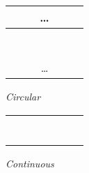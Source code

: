 \vspace{1.1em}
\begin{minipage}[t]{0.5\textwidth}
    \centering
        \begin{tabular}{| c | c | c | c | c | c | c |}
            \multicolumn{7}{c}{\dots} \\
            \hline
            \rowcolor{bootblue} & & & & & & \\
            \hline
            \rowcolor{bootgreen} & & & & & & \\
            \hline
            \rowcolor{bootred} & & & & & & \\
            \hline
            \rowcolor{bootblue} & & & & & & \\
            \hline
            \rowcolor{bootgreen} & & & & & & \\
            \hline
            \rowcolor{bootred} & & & & & & \\
            \hline
            \rowcolor{bootblue} & & & & & & \\
            \hline
            \multicolumn{7}{c}{\dots} \\
        \end{tabular}

        \textit{Circular}
\end{minipage}
\begin{minipage}[t]{0.5\textwidth}
    \centering
        \begin{tabular}{| c | c | c | c | c | c | c |}
            \hline
            \rowcolor{bootblue} & & & & & & \\
            \hline
            \rowcolor{bootblue} & & & & & & \\
            \hline
            \rowcolor{bootblue} & & & & & & \\
            \hline
            \rowcolor{bootgreen} & & & & & & \\
            \hline
            \rowcolor{bootgreen} & & & & & & \\
            \hline
            \rowcolor{bootgreen} & & & & & & \\
            \hline
            \rowcolor{bootred} & & & & & & \\
            \hline
            \rowcolor{bootred} & & & & & & \\
            \hline
        \end{tabular}

        \textit{Continuous}
\end{minipage}

